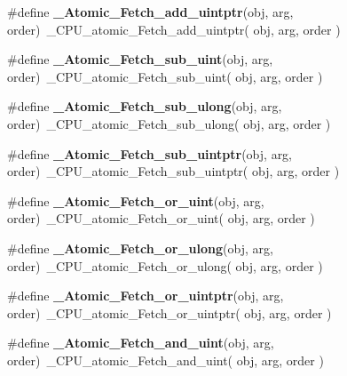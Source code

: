 \begin{DoxyCompactItemize}
\#define {\bfseries \+\_\+\+Atomic\+\_\+\+Fetch\+\_\+add\+\_\+uintptr}(obj,  arg,  order)~\+\_\+\+C\+P\+U\+\_\+atomic\+\_\+\+Fetch\+\_\+add\+\_\+uintptr( obj, arg, order )
\item 
\mbox{\label{group__RTEMSScoreAtomic_ga170de6282d81204826d24fc2897ef104}} 
\#define {\bfseries \+\_\+\+Atomic\+\_\+\+Fetch\+\_\+sub\+\_\+uint}(obj,  arg,  order)~\+\_\+\+C\+P\+U\+\_\+atomic\+\_\+\+Fetch\+\_\+sub\+\_\+uint( obj, arg, order )
\item 
\mbox{\label{group__RTEMSScoreAtomic_ga0f7df41cf6245b96f12701a542d715f8}} 
\#define {\bfseries \+\_\+\+Atomic\+\_\+\+Fetch\+\_\+sub\+\_\+ulong}(obj,  arg,  order)~\+\_\+\+C\+P\+U\+\_\+atomic\+\_\+\+Fetch\+\_\+sub\+\_\+ulong( obj, arg, order )
\item 
\mbox{\label{group__RTEMSScoreAtomic_ga6f0db1367eadd175f5e68872dd8e76cb}} 
\#define {\bfseries \+\_\+\+Atomic\+\_\+\+Fetch\+\_\+sub\+\_\+uintptr}(obj,  arg,  order)~\+\_\+\+C\+P\+U\+\_\+atomic\+\_\+\+Fetch\+\_\+sub\+\_\+uintptr( obj, arg, order )
\item 
\mbox{\label{group__RTEMSScoreAtomic_gaa09a3c4a06145f6b7dcb967762c8fd8e}} 
\#define {\bfseries \+\_\+\+Atomic\+\_\+\+Fetch\+\_\+or\+\_\+uint}(obj,  arg,  order)~\+\_\+\+C\+P\+U\+\_\+atomic\+\_\+\+Fetch\+\_\+or\+\_\+uint( obj, arg, order )
\item 
\mbox{\label{group__RTEMSScoreAtomic_gae9f34b55a23d360f0c724c4908e63693}} 
\#define {\bfseries \+\_\+\+Atomic\+\_\+\+Fetch\+\_\+or\+\_\+ulong}(obj,  arg,  order)~\+\_\+\+C\+P\+U\+\_\+atomic\+\_\+\+Fetch\+\_\+or\+\_\+ulong( obj, arg, order )
\item 
\mbox{\label{group__RTEMSScoreAtomic_ga8b735e26c67538ca9906db995e56a669}} 
\#define {\bfseries \+\_\+\+Atomic\+\_\+\+Fetch\+\_\+or\+\_\+uintptr}(obj,  arg,  order)~\+\_\+\+C\+P\+U\+\_\+atomic\+\_\+\+Fetch\+\_\+or\+\_\+uintptr( obj, arg, order )
\item 
\mbox{\label{group__RTEMSScoreAtomic_ga1744d2bfdcd755f7e55fd57affbb3da5}} 
\#define {\bfseries \+\_\+\+Atomic\+\_\+\+Fetch\+\_\+and\+\_\+uint}(obj,  arg,  order)~\+\_\+\+C\+P\+U\+\_\+atomic\+\_\+\+Fetch\+\_\+and\+\_\+uint( obj, arg, order )

\end{DoxyCompactItemize}
